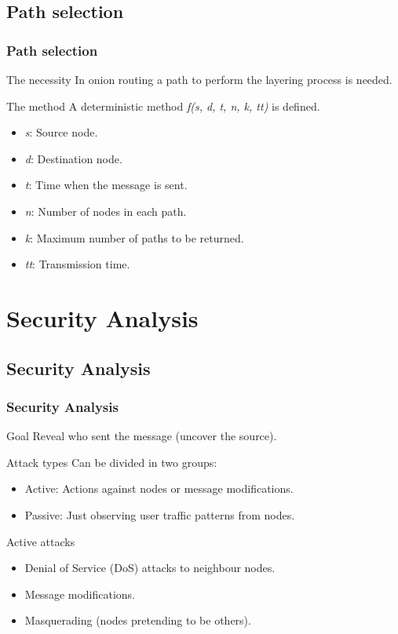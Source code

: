 \documentclass[compress,red]{beamer}
\begin{document}
\subsection{Path selection}
\begin{frame}
\frametitle{Path selection}
\begin{block}{The necessity}
In onion routing a path to perform the layering process is needed.
\end{block}
\bigskip
\begin{block}{The method}
A deterministic method \textit{f(s, d, t, n, k, tt)} is defined.
\begin{itemize}
\item \textit{s}: Source node.
\item \textit{d}: Destination node.
\item \textit{t}: Time when the message is sent.
\item \textit{n}: Number of nodes in each path.
\item \textit{k}: Maximum number of paths to be returned.
\item \textit{tt}: Transmission time.
\end{itemize}
\end{block}
\end{frame} %

\section{Security Analysis}
\subsection{Security Analysis}
\begin{frame}
\frametitle{Security Analysis}
\begin{block}{Goal}
Reveal who sent the message (uncover the source).
\end{block}
\begin{block}{Attack types}
Can be divided in two groups:
\begin{itemize}
\item Active: Actions against nodes or message modifications.
\item Passive: Just observing user traffic patterns from nodes.
\end{itemize}
\end{block}
\bigskip
\begin{block}{Active attacks}
\begin{itemize}
\item Denial of Service (DoS) attacks to neighbour nodes.
\item Message modifications.
\item Masquerading (nodes pretending to be others).
\end{itemize}
\end{block}
\end{frame}
\end{document}
